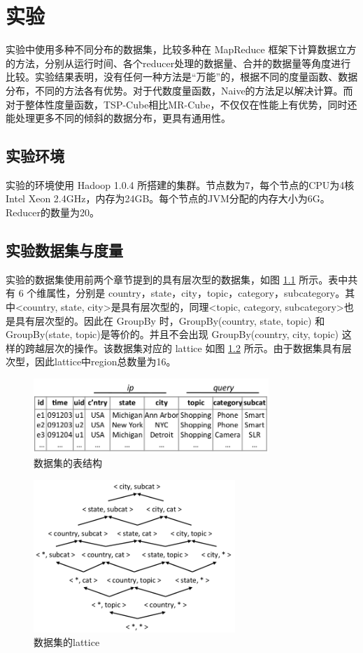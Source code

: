 \chapter{实验}

实验中使用多种不同分布的数据集，比较多种在 MapReduce 框架下计算数据立方的方法，分别从运行时间、各个reducer处理的数据量、合并的数据量等角度进行比较。实验结果表明，没有任何一种方法是``万能”的，根据不同的度量函数、数据分布，不同的方法各有优势。对于代数度量函数，Naive的方法足以解决计算。而对于整体性度量函数，TSP-Cube相比MR-Cube，不仅仅在性能上有优势，同时还能处理更多不同的倾斜的数据分布，更具有通用性。

\section{实验环境}
实验的环境使用 Hadoop 1.0.4 所搭建的集群。节点数为7，每个节点的CPU为4核 Intel Xeon 2.4GHz，内存为24GB。每个节点的JVM分配的内存大小为6G。Reducer的数量为20。

\section{实验数据集与度量}

实验的数据集使用前两个章节提到的具有层次型的数据集，如图 \ref{dataset_table} 所示。表中共有 6 个维属性，分别是 country，state，city，topic，category，subcategory。其中\textless country, state, city\textgreater 是具有层次型的，同理\textless topic, category, subcategory\textgreater 也是具有层次型的。因此在 GroupBy 时，GroupBy(country, state, topic) 和 GroupBy(state, topic)是等价的。并且不会出现 GroupBy(country, city, topic) 这样的跨越层次的操作。该数据集对应的 lattice 如图 \ref{dataset_lattice} 所示。由于数据集具有层次型，因此lattice中region总数量为16。

\begin{figure}[!htb]
\centering\includegraphics[width=3.5in]{picture/ch_datacube_mr/dataset_table} 
\caption{数据集的表结构}\label{dataset_table} 
\end{figure} 

\begin{figure}[!htb]
\centering\includegraphics[width=3in]{picture/ch_datacube_mr/dataset_lattice} 
\caption{数据集的lattice}\label{dataset_lattice} 
\end{figure} 

